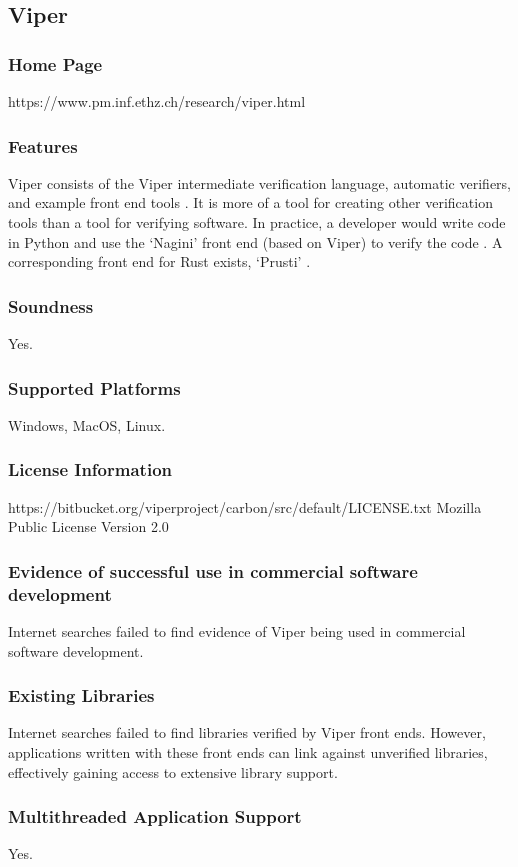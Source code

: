 \documentclass[11pt]{article}
\begin{document}
\subsection{Viper}
	\subsubsection{Home Page}%
https://www.pm.inf.ethz.ch/research/viper.html
	\subsubsection{Features}
		Viper consists of the Viper intermediate verification language, automatic verifiers, and example front end tools \cite{viper01}. It is more of a tool for creating other verification tools than a tool for verifying software. In practice, a developer would write code in Python and use the `Nagini' front end (based on Viper) to verify the code \cite{Eilers2018NaginiAS}. A corresponding front end for Rust exists, `Prusti' \cite{AstrauskasMuellerPoliSummers19}.
	\subsubsection{Soundness}
		Yes.
	\subsubsection{Supported Platforms}
		Windows, MacOS, Linux\cite{JuhaszUri2014VAVI}.
	\subsubsection{License Information}
	https://bitbucket.org/viperproject/carbon/src/default/LICENSE.txt
		Mozilla Public License Version 2.0\cite{viperlicense}
	\subsubsection{Evidence of successful use in commercial software development}
		Internet searches failed to find evidence of Viper being used in commercial software development.
	\subsubsection{Existing Libraries}
		Internet searches failed to find libraries verified by Viper front ends. However, applications written with these front ends can link against unverified libraries, effectively gaining access to extensive library support.
	\subsubsection{Multithreaded Application Support}
	Yes.
\end{document}
